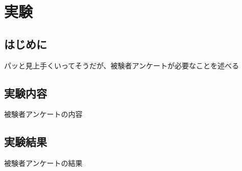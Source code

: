 \documentclass[\homedir/main.tex]{subfiles}
\begin{document}
\setcounter{chapter}{4}
\chapter{実験}\label{sec:results}

\section{はじめに}
パッと見上手くいってそうだが、被験者アンケートが必要なことを述べる

\section{実験内容}
被験者アンケートの内容

\section{実験結果}
被験者アンケートの結果
\end{document}
